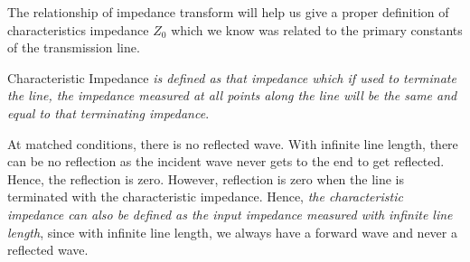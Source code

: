 The relationship of impedance transform will help us give a proper definition of characteristics impedance $Z_0$ which we know was related to the primary constants of the transmission line.

Characteristic Impedance \emph{is defined as that impedance which if used to terminate the line, the impedance measured at all points along the line will be the same and equal to that terminating impedance}.

At matched conditions, there is no reflected wave. With infinite line length, there can be no reflection as the incident wave never gets to the end to get reflected. Hence, the reflection is zero. However, reflection is zero when the line is terminated with the characteristic impedance. Hence, \emph{the characteristic impedance can also be defined as the input impedance measured with infinite line length}, since with infinite line length, we always have a forward wave and never a reflected wave.

